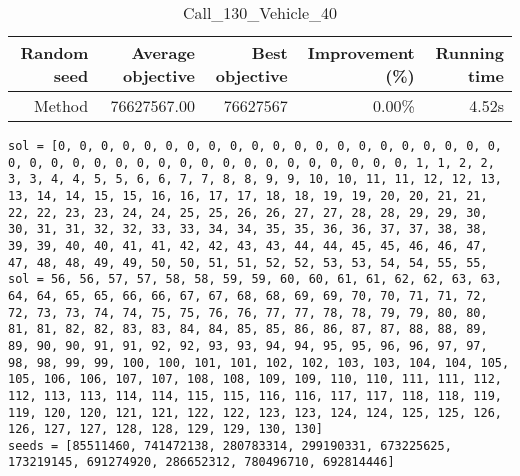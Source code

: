 \begin{table}[ht]
\centering
\caption{Call\_130\_Vehicle\_40}
\label{tab:call130vehicle40}
\begin{tabular}{|r|r|r|r|r|}
Random seed & Average objective & Best objective & Improvement (\%) & Running time \\
\hline
Method & 76627567.00 & 76627567 & 0.00\% & 4.52s\\
\end{tabular}
\end{table}
\begin{lstlisting}[label={lst:call130vehicle40},caption=Optimal solution call\_130\_vehicle\_40]
sol = [0, 0, 0, 0, 0, 0, 0, 0, 0, 0, 0, 0, 0, 0, 0, 0, 0, 0, 0, 0, 0, 0, 0, 0, 0, 0, 0, 0, 0, 0, 0, 0, 0, 0, 0, 0, 0, 0, 0, 0, 1, 1, 2, 2, 3, 3, 4, 4, 5, 5, 6, 6, 7, 7, 8, 8, 9, 9, 10, 10, 11, 11, 12, 12, 13, 13, 14, 14, 15, 15, 16, 16, 17, 17, 18, 18, 19, 19, 20, 20, 21, 21, 22, 22, 23, 23, 24, 24, 25, 25, 26, 26, 27, 27, 28, 28, 29, 29, 30, 30, 31, 31, 32, 32, 33, 33, 34, 34, 35, 35, 36, 36, 37, 37, 38, 38, 39, 39, 40, 40, 41, 41, 42, 42, 43, 43, 44, 44, 45, 45, 46, 46, 47, 47, 48, 48, 49, 49, 50, 50, 51, 51, 52, 52, 53, 53, 54, 54, 55, 55,
sol = 56, 56, 57, 57, 58, 58, 59, 59, 60, 60, 61, 61, 62, 62, 63, 63, 64, 64, 65, 65, 66, 66, 67, 67, 68, 68, 69, 69, 70, 70, 71, 71, 72, 72, 73, 73, 74, 74, 75, 75, 76, 76, 77, 77, 78, 78, 79, 79, 80, 80, 81, 81, 82, 82, 83, 83, 84, 84, 85, 85, 86, 86, 87, 87, 88, 88, 89, 89, 90, 90, 91, 91, 92, 92, 93, 93, 94, 94, 95, 95, 96, 96, 97, 97, 98, 98, 99, 99, 100, 100, 101, 101, 102, 102, 103, 103, 104, 104, 105, 105, 106, 106, 107, 107, 108, 108, 109, 109, 110, 110, 111, 111, 112, 112, 113, 113, 114, 114, 115, 115, 116, 116, 117, 117, 118, 118, 119, 119, 120, 120, 121, 121, 122, 122, 123, 123, 124, 124, 125, 125, 126, 126, 127, 127, 128, 128, 129, 129, 130, 130]
seeds = [85511460, 741472138, 280783314, 299190331, 673225625, 173219145, 691274920, 286652312, 780496710, 692814446]
\end{lstlisting}
\clearpage



